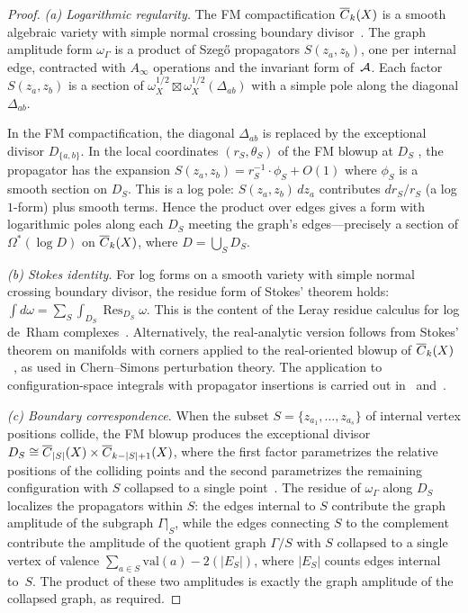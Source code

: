 \begin{proof}
\emph{(a) Logarithmic regularity.}
The FM compactification $\overline{C}_{k}(X)$ is a smooth algebraic
variety with simple normal crossing boundary
divisor~\cite{FM94}.  The graph amplitude form $\omega_\Gamma$ is a
product of Szeg\H{o} propagators $S(z_a, z_b)$, one per internal
edge, contracted with $A_\infty$ operations and the invariant form
of~$\mathcal{A}$.  Each factor $S(z_a, z_b)$ is a section of
$\omega_X^{1/2} \boxtimes \omega_X^{1/2}(\Delta_{ab})$
with a simple pole along the diagonal $\Delta_{ab}$.

In the FM compactification, the diagonal $\Delta_{ab}$ is replaced
by the exceptional divisor $D_{\{a,b\}}$.  In the local coordinates
$(r_S, \theta_S)$ of the FM blowup at $D_S$
\cite[§2]{FM94}, the propagator has the expansion
$S(z_a, z_b) = r_S^{-1} \cdot \phi_S + O(1)$ where $\phi_S$ is a
smooth section on $D_S$.  This is a log pole:
$S(z_a,z_b) \, dz_a$ contributes $dr_S/r_S$ (a log
$1$-form) plus smooth terms.  Hence the product over edges gives a
form with logarithmic poles along each $D_S$ meeting the graph's
edges---precisely a section of $\Omega^*(\log D)$ on
$\overline{C}_{k}(X)$, where $D = \bigcup_S D_S$.

\emph{(b) Stokes identity.}
For log forms on a smooth variety with simple normal crossing
boundary divisor, the residue form of Stokes' theorem holds:
$\int d\omega = \sum_S \int_{D_S} \operatorname{Res}_{D_S} \omega$.
This is the content of the Leray residue calculus for log de~Rham
complexes~\cite{Deligne70}.  Alternatively, the real-analytic
version follows from Stokes' theorem on manifolds with corners
applied to the real-oriented blowup of
$\overline{C}_{k}(X)$~\cite{AS94}, as used in Chern--Simons
perturbation theory.  The application to configuration-space
integrals with propagator insertions is carried out
in~\cite{Kontsevich03} and~\cite{costello-renormalization}.

\emph{(c) Boundary correspondence.}
When the subset $S = \{z_{a_1}, \ldots, z_{a_s}\}$ of internal
vertex positions collide, the FM blowup produces the exceptional
divisor $D_S \cong \overline{C}_{|S|}(X) \times \overline{C}_{k-|S|+1}(X)$,
where the first factor parametrizes the relative positions of the
colliding points and the second parametrizes the remaining
configuration with $S$ collapsed to a single point~\cite[§3]{FM94}.
The residue of $\omega_\Gamma$ along $D_S$ localizes the
propagators within $S$: the edges internal to $S$ contribute the
graph amplitude of the subgraph $\Gamma|_S$, while the edges
connecting $S$ to the complement contribute the amplitude of the
quotient graph $\Gamma/S$ with $S$ collapsed to a single vertex
of valence $\sum_{a \in S} \mathrm{val}(a) - 2(|E_S|)$, where
$|E_S|$ counts edges internal to~$S$.  The product of these two
amplitudes is exactly the graph amplitude of the collapsed graph,
as required.
\end{proof}

